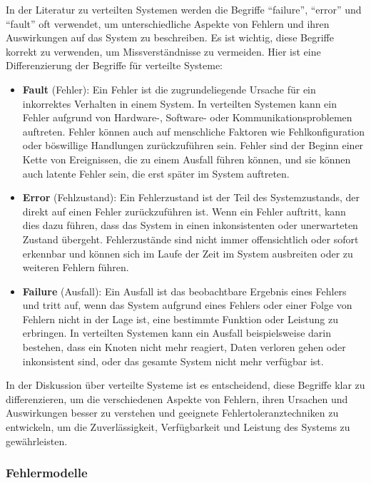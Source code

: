 \documentclass[../vs-script-first-v01.tex]{subfiles}
\begin{document}
In der Literatur zu verteilten Systemen werden die Begriffe \enquote{failure}, \enquote{error} und \enquote{fault} oft verwendet, um unterschiedliche Aspekte von Fehlern und ihren Auswirkungen auf das System zu beschreiben. Es ist wichtig, diese Begriffe korrekt zu verwenden, um Missverständnisse zu vermeiden. Hier ist eine Differenzierung der Begriffe für verteilte Systeme:
\begin{itemize}
\item \textbf{Fault} (Fehler): Ein Fehler ist die zugrundeliegende Ursache für ein inkorrektes Verhalten in einem System. In verteilten Systemen kann ein Fehler aufgrund von Hardware-, Software- oder Kommunikationsproblemen auftreten. Fehler können auch auf menschliche Faktoren wie Fehlkonfiguration oder böswillige Handlungen zurückzuführen sein. Fehler sind der Beginn einer Kette von Ereignissen, die zu einem Ausfall führen können, und sie können auch latente Fehler sein, die erst später im System auftreten.
\item \textbf{Error} (Fehlzustand): Ein Fehlerzustand ist der Teil des Systemzustands, der direkt auf einen Fehler zurückzuführen ist. Wenn ein Fehler auftritt, kann dies dazu führen, dass das System in einen inkonsistenten oder unerwarteten Zustand übergeht. Fehlerzustände sind nicht immer offensichtlich oder sofort erkennbar und können sich im Laufe der Zeit im System ausbreiten oder zu weiteren Fehlern führen.
\item \textbf{Failure} (Ausfall): Ein Ausfall ist das beobachtbare Ergebnis eines Fehlers und tritt auf, wenn das System aufgrund eines Fehlers oder einer Folge von Fehlern nicht in der Lage ist, eine bestimmte Funktion oder Leistung zu erbringen. In verteilten Systemen kann ein Ausfall beispielsweise darin bestehen, dass ein Knoten nicht mehr reagiert, Daten verloren gehen oder inkonsistent sind, oder das gesamte System nicht mehr verfügbar ist.
\end{itemize}
In der Diskussion über verteilte Systeme ist es entscheidend, diese Begriffe klar zu differenzieren, um die verschiedenen Aspekte von Fehlern, ihren Ursachen und Auswirkungen besser zu verstehen und geeignete Fehlertoleranztechniken zu entwickeln, um die Zuverlässigkeit, Verfügbarkeit und Leistung des Systems zu gewährleisten.


\subsubsection{Fehlermodelle}
\end{document}
